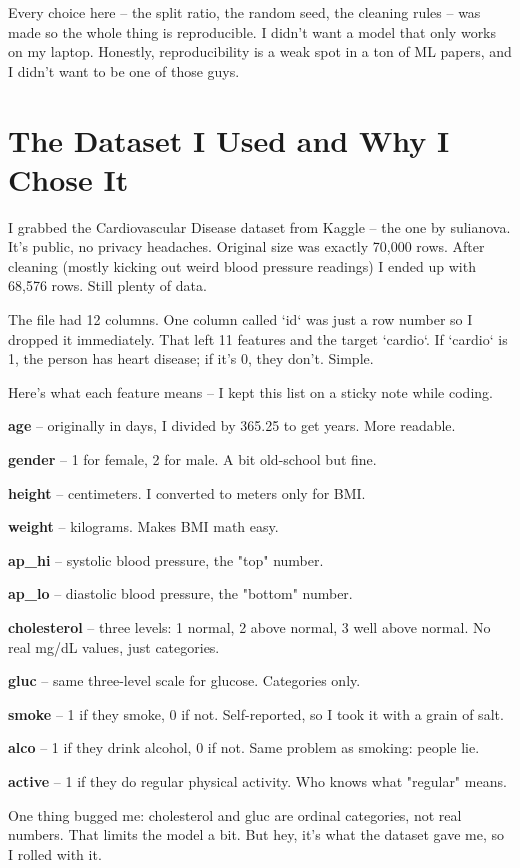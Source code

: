\documentclass[12pt, a4paper, oneside]{book}
\begin{document}
Every choice here – the split ratio, the random seed, the cleaning rules – was made so the whole thing is reproducible. I didn't want a model that only works on my laptop. Honestly, reproducibility is a weak spot in a ton of ML papers, and I didn't want to be one of those guys.

\section{The Dataset I Used and Why I Chose It}
I grabbed the Cardiovascular Disease dataset from Kaggle – the one by sulianova. It's public, no privacy headaches. Original size was exactly 70,000 rows. After cleaning (mostly kicking out weird blood pressure readings) I ended up with 68,576 rows. Still plenty of data.

The file had 12 columns. One column called `id` was just a row number so I dropped it immediately. That left 11 features and the target `cardio`. If `cardio` is 1, the person has heart disease; if it's 0, they don't. Simple.

Here's what each feature means – I kept this list on a sticky note while coding.

\textbf{age} – originally in days, I divided by 365.25 to get years. More readable.

\textbf{gender} – 1 for female, 2 for male. A bit old-school but fine.

\textbf{height} – centimeters. I converted to meters only for BMI.

\textbf{weight} – kilograms. Makes BMI math easy.

\textbf{ap\_hi} – systolic blood pressure, the "top" number.

\textbf{ap\_lo} – diastolic blood pressure, the "bottom" number.

\textbf{cholesterol} – three levels: 1 normal, 2 above normal, 3 well above normal. No real mg/dL values, just categories.

\textbf{gluc} – same three-level scale for glucose. Categories only.

\textbf{smoke} – 1 if they smoke, 0 if not. Self-reported, so I took it with a grain of salt.

\textbf{alco} – 1 if they drink alcohol, 0 if not. Same problem as smoking: people lie.

\textbf{active} – 1 if they do regular physical activity. Who knows what "regular" means.

One thing bugged me: cholesterol and gluc are ordinal categories, not real numbers. That limits the model a bit. But hey, it's what the dataset gave me, so I rolled with it.
\end{document}
